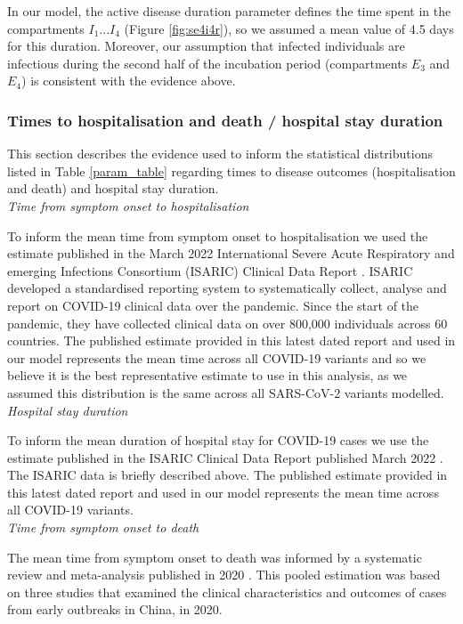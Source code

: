 In our model, the active disease duration parameter defines the time spent in the compartments $I_1...I_4$ (Figure \ref{fig:se4i4r}), 
so we assumed a mean value of 4.5 days for this duration. Moreover, our assumption that infected individuals are infectious during 
the second half of the incubation period (compartments $E_3$ and $E_4$) is consistent with the evidence above. 


\subsubsection{Times to hospitalisation and death / hospital stay duration}
This section describes the evidence used to inform the statistical distributions listed in Table \ref{param_table}
regarding times to disease outcomes (hospitalisation and death) and hospital stay duration.\\

\textit{Time from symptom onset to hospitalisation}

To inform the mean time from symptom onset to hospitalisation we used the estimate published in the March 2022 International Severe Acute Respiratory 
and emerging Infections Consortium (ISARIC) Clinical Data Report \cite{isaric2022}. ISARIC developed a standardised reporting system to systematically 
collect, analyse and report on COVID-19 clinical data over the pandemic. Since the start of the pandemic, they have collected clinical data on over 
800,000 individuals across 60 countries. The published estimate provided in this latest dated report and used in our model represents the mean time 
across all COVID-19 variants and so we believe it is the best representative estimate to use in this analysis, as we assumed this distribution is the 
same across all SARS-CoV-2 variants modelled.\\

\textit{Hospital stay duration}

To inform the mean duration of hospital stay for COVID-19 cases we use the estimate published in the ISARIC Clinical Data Report published March 2022 \cite{isaric2022}. 
The ISARIC data is briefly described above. The published estimate provided in this latest dated report and used in our model represents the mean time across all COVID-19 
variants.\\

\textit{Time from symptom onset to death}

The mean time from symptom onset to death was informed by a systematic review and meta-analysis published in 2020 \cite{khalili2020}. This pooled estimation was based on three studies 
that examined the clinical characteristics and outcomes of cases from early outbreaks in China, in 2020.


